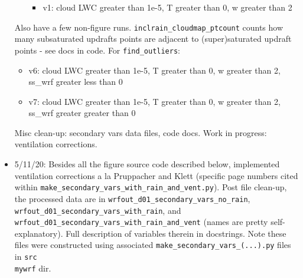 \documentclass{article}
\begin{document}
\begin{itemize}
\begin{itemize}
		\begin{itemize}
			\item v1: cloud LWC greater than 1e-5, T greater than 0, w greater than 2
		\end{itemize}
	\end{itemize}
	\indent Also have a few non-figure runs. \texttt{inclrain\_cloudmap\_ptcount} counts how many subsaturated updrafts points are adjacent to (super)saturated updraft points - see docs in code. For \texttt{find\_outliers}:
	\begin{itemize}
		\item v6: cloud LWC greater than 1e-5, T greater than 0, w greater than 2, ss\_wrf greater less than 0
		\item v7: cloud LWC greater than 1e-5, T greater than 0, w greater than 2, ss\_wrf greater greater than 0
	\end{itemize}
	\indent Misc clean-up: secondary vars data files, code docs. Work in progress: ventilation corrections. 
	\item 5/11/20: Besides all the figure source code described below, implemented ventilation corrections a la Pruppacher and Klett (specific page numbers cited within \texttt{make\_secondary\_vars\_with\_rain\_and\_vent.py}). Post file clean-up, the processed data are in \texttt{wrfout\_d01\_secondary\_vars\_no\_rain}, \texttt{wrfout\_d01\_secondary\_vars\_with\_rain}, and \texttt{wrfout\_d01\_secondary\_vars\_with\_rain\_and\_vent} (names are pretty self-explanatory). Full description of variables therein in docstrings. Note these files were constructed using associated \texttt{make\_secondary\_vars\_(...).py} files in \texttt{src\\mywrf} dir. 


\end{itemize}
\end{document}
